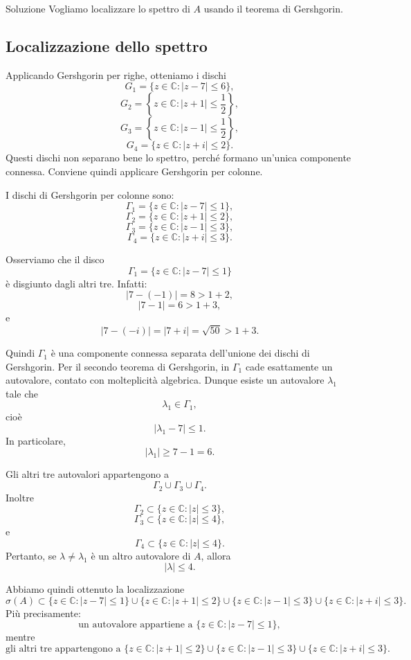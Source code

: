 \documentclass[a4paper]{article}
\begin{document}
\begin{snippetsolution}{Soluzione}
    Vogliamo localizzare lo spettro di \(A\) usando il teorema di Gershgorin.

    \subsection*{Localizzazione dello spettro}

    Applicando Gershgorin per righe, otteniamo i dischi
    \[
        G_1=\{z\in\mathbb{C}: |z-7|\leq 6\},
    \]
    \[
        G_2=\left\{z\in\mathbb{C}: |z+1|\leq \frac{1}{2}\right\},
    \]
    \[
        G_3=\left\{z\in\mathbb{C}: |z-1|\leq \frac{1}{2}\right\},
    \]
    \[
        G_4=\{z\in\mathbb{C}: |z+i|\leq 2\}.
    \]
    Questi dischi non separano bene lo spettro, perché formano un'unica componente connessa. Conviene quindi applicare Gershgorin per colonne.

    I dischi di Gershgorin per colonne sono:
    \[
        \Gamma_1=\{z\in\mathbb{C}: |z-7|\leq 1\},
    \]
    \[
        \Gamma_2=\{z\in\mathbb{C}: |z+1|\leq 2\},
    \]
    \[
        \Gamma_3=\{z\in\mathbb{C}: |z-1|\leq 3\},
    \]
    \[
        \Gamma_4=\{z\in\mathbb{C}: |z+i|\leq 3\}.
    \]

    Osserviamo che il disco
    \[
        \Gamma_1=\{z\in\mathbb{C}: |z-7|\leq 1\}
    \]
    è disgiunto dagli altri tre. Infatti:
    \[
        |7-(-1)|=8>1+2,
    \]
    \[
        |7-1|=6>1+3,
    \]
    e
    \[
        |7-(-i)|=|7+i|=\sqrt{50}>1+3.
    \]

    Quindi \(\Gamma_1\) è una componente connessa separata dell'unione dei dischi di Gershgorin. Per il secondo teorema di Gershgorin, in \(\Gamma_1\) cade esattamente un autovalore, contato con molteplicità algebrica. Dunque esiste un autovalore \(\lambda_1\) tale che
    \[
        \lambda_1\in \Gamma_1,
    \]
    cioè
    \[
        |\lambda_1-7|\leq 1.
    \]
    In particolare,
    \[
        |\lambda_1|\geq 7-1=6.
    \]

    Gli altri tre autovalori appartengono a
    \[
        \Gamma_2\cup \Gamma_3\cup \Gamma_4.
    \]
    Inoltre
    \[
        \Gamma_2\subset \{z\in\mathbb{C}: |z|\leq 3\},
    \]
    \[
        \Gamma_3\subset \{z\in\mathbb{C}: |z|\leq 4\},
    \]
    e
    \[
        \Gamma_4\subset \{z\in\mathbb{C}: |z|\leq 4\}.
    \]
    Pertanto, se \(\lambda\neq \lambda_1\) è un altro autovalore di \(A\), allora
    \[
        |\lambda|\leq 4.
    \]

    Abbiamo quindi ottenuto la localizzazione
    \[
        \boxed{
            \sigma(A)\subset
            \{z\in\mathbb{C}: |z-7|\leq 1\}
            \cup
            \{z\in\mathbb{C}: |z+1|\leq 2\}
            \cup
            \{z\in\mathbb{C}: |z-1|\leq 3\}
            \cup
            \{z\in\mathbb{C}: |z+i|\leq 3\}.
        }
    \]
    Più precisamente:
    \[
        \boxed{
            \text{un autovalore appartiene a } \{z\in\mathbb{C}: |z-7|\leq 1\},
        }
    \]
    mentre
    \[
        \boxed{
            \text{gli altri tre appartengono a }
            \{z\in\mathbb{C}: |z+1|\leq 2\}
            \cup
            \{z\in\mathbb{C}: |z-1|\leq 3\}
            \cup
            \{z\in\mathbb{C}: |z+i|\leq 3\}.
        }
    \]


\end{snippetsolution}
\end{document}
